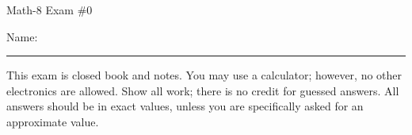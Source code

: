\documentclass[letterpaper,12pt,fleqn]{article}
\begin{document}
\begin{center}
\Large Math-8 Exam \#0
\end{center}

\vspace{0.5in}

Name: \rule{4in}{1pt}

\vspace{0.5in}

This exam is closed book and notes. You may use a calculator; however, no other
electronics are allowed. Show all work; there is no credit for guessed
answers. All answers should be in exact values, unless you are specifically
asked for an approximate value.

\vspace{1in}

\newcommand{\fillin}{\rule[-10pt]{2in}{1pt}}
\newcommand{\sfillin}{\rule[-10pt]{0.5in}{1pt}}
\end{document}
